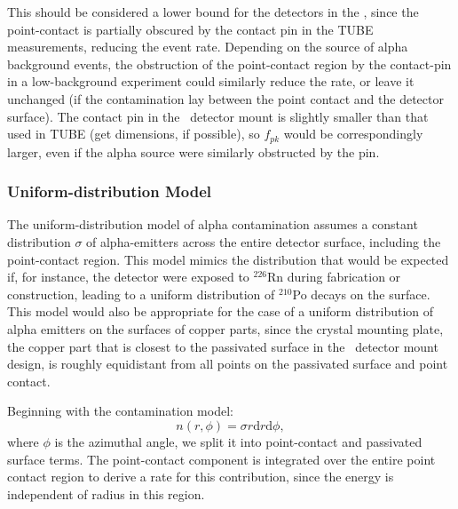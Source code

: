 This should be considered a lower bound for the detectors in the \DEM , since the point-contact is partially obscured by the contact pin in the TUBE measurements, reducing the event rate. Depending on the source of alpha background events, the obstruction of the point-contact region by the contact-pin in a low-background experiment could similarly reduce the rate, or leave it unchanged (if the contamination lay between the point contact and the detector surface). The contact pin in the \MJ\ detector mount is slightly smaller than that used in TUBE (get dimensions, if possible), so $f_{pk}$ would be correspondingly larger, even if the alpha source were similarly obstructed by the pin.

\subsubsection{Uniform-distribution Model}
The uniform-distribution model of alpha contamination assumes a constant distribution $\sigma$ of alpha-emitters across the entire detector surface, including the point-contact region. This model mimics the distribution that would be expected if, for instance, the detector were exposed to $^{226}$Rn during fabrication or construction, leading to a uniform distribution of $^{210}$Po decays on the surface. This model would also be appropriate for the case of a uniform distribution of alpha emitters on the surfaces of copper parts, since the crystal mounting plate, the copper part that is closest to the passivated surface in the \MJ\ detector mount design, is roughly equidistant from all points on the passivated surface and point contact. 

Beginning with the contamination model:
$$n(r, \phi) = \sigma r \mathrm{d}r \mathrm{d}\phi, $$
where $\phi$ is the azimuthal angle, we split it into point-contact and passivated surface terms. The point-contact component is integrated over the entire point contact region to derive a rate for this contribution, since the energy is independent of radius in this region. 

